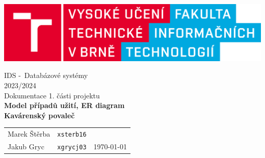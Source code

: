 \documentclass[a4paper, 11pt]{article}
\begin{document}
\begin{titlepage}
		\begin{center}
			\includegraphics[width=0.85\linewidth]{./logo_cz.png} \\


            \Large{IDS \--\ Databázové systémy} \\
            \LARGE{2023/2024} \\[0.4em]

			\LARGE{Dokumentace 1. části projektu} \\
			\Huge{\textbf{Model případů užití, ER diagram}} \\
            \bigskip
            \Large{\textbf{Kavárenský povaleč}} \\
            
		\end{center}

			\Large

   
            \begin{tabularx}{0.96\textwidth}{ll>{\raggedleft\arraybackslash}X}
                Marek Štěrba & \texttt{xsterb16} \\
                Jakub Gryc & \texttt{xgrycj03} &  \Large\today  \\
			\end{tabularx}


	\end{titlepage}
\end{document}
